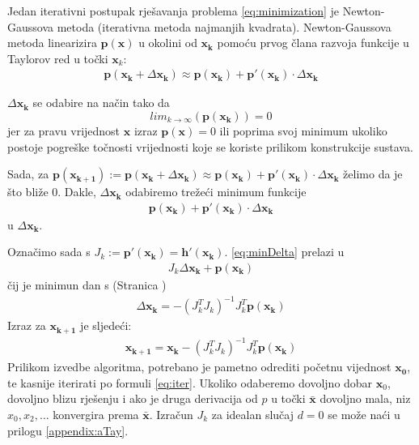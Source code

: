 \documentclass[a4paper,twoside,12pt]{memoir} %
\begin{document}
Jedan iterativni postupak rješavanja problema \ref{eq:minimization} je Newton-Gaussova metoda (iterativna metoda najmanjih kvadrata).
Newton-Gaussova metoda linearizira $\mathbf{p}(\mathbf{x})$ u okolini od $\mathbf{x_k}$ pomoću prvog člana razvoja funkcije u Taylorov red\label{stranica:NGLin} u točki $\mathbf{x}_k$:
\begin{align}\label{eq:approx}
	\mathbf{p}(\mathbf{x_k}+ \Delta \mathbf{x_k}) \approx \mathbf{p}(\mathbf{x_k}) + \mathbf{p}'(\mathbf{ x_k})\cdot \Delta \mathbf{x_k}
\end{align}

$\Delta \mathbf{x_k}$ se odabire na način tako da
$$lim_{k \to \infty} \left( \mathbf{p}(\mathbf{x_k}) \right) = 0$$ 
jer za pravu vrijednost $\mathbf{x}$ izraz $\mathbf{p}(\mathbf{x}) = 0$ ili poprima svoj minimum ukoliko postoje pogreške
točnosti vrijednosti koje se koriste prilikom konstrukcije sustava.
 
Sada, za $\mathbf{p}(\mathbf{x_{k+1}}) := \mathbf{p}(\mathbf{x_k}+ \Delta \mathbf{x_k}) \approx \mathbf{p}(\mathbf{x_k}) + \mathbf{p}'(\mathbf{x_k})\cdot \Delta \mathbf{x_k}$ želimo
 da je što bliže 0.
 Dakle, $ \Delta \mathbf{x_k} $ odabiremo trežeći minimum funkcije
\begin{align}\label{eq:minDelta}
	\mathbf{p}(\mathbf{x_k}) + \mathbf{p}'(\mathbf{x_k})\cdot \Delta \mathbf{x_k}
\end{align}
u $\Delta \mathbf{x_k}$.

Označimo sada s $J_k := \mathbf{p}'(\mathbf{x_k}) = \mathbf{h}'(\mathbf{x_k})$.
\ref{eq:minDelta} prelazi u 
\begin{align}\label{eq:minDelta2}
	J_k \Delta \mathbf{x_k} +\mathbf{p}(\mathbf{x_k})
\end{align}
čij je minimun dan s (Stranica \pageref{stranica:nastavakLS})  
\begin{align}\label{eq:minDeltaRj}
\Delta \mathbf{x_k} = - (J_k^TJ_k)^{-1}J_k^T \mathbf{p}(\mathbf{x_k})
\end{align}
Izraz za $\mathbf{x_{k+1}}$ je sljedeći:
\begin{align}\label{eq:iter}
	\mathbf{x_{k+1}} = \mathbf{x_{k}} - (J_k^TJ_k)^{-1}J_k^T \mathbf{p}(\mathbf{x_k})
\end{align}
Prilikom izvedbe algoritma, potrebano je pametno odrediti početnu vijednost $\mathbf{x_0}$, te kasnije iterirati po formuli \ref{eq:iter}.
Ukoliko odaberemo dovoljno dobar $\mathbf{x}_0$, dovoljno blizu rješenju i
ako je druga derivacija od $p$ u točki $\bar{\mathbf{x}}$ dovoljno mala,
niz $x_0,x_2, \hdots$ konvergira prema $\bar{\mathbf{x}}$. Izračun $J_k$ za idealan slučaj $d = 0$ se može naći u prilogu \ref{appendix:aTay}.
\end{document}
